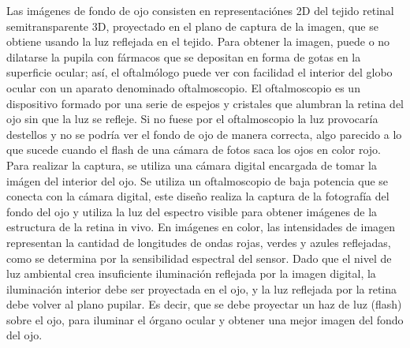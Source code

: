 Las im\'agenes de fondo de ojo consisten en representaci\'ones 2D del tejido retinal semitransparente 3D, proyectado en el plano de captura de la imagen, que se obtiene usando la luz reflejada en el tejido.
Para obtener la imagen, puede o no dilatarse la pupila con f\'armacos que se depositan en forma de gotas en la superficie ocular; as\'i, el oftalm\'ologo puede ver con facilidad el interior del globo ocular con un aparato denominado oftalmoscopio. El oftalmoscopio es un dispositivo formado por una serie de espejos y cristales que alumbran la retina del ojo sin que la luz se refleje. Si no fuese por el oftalmoscopio la luz provocar\'ia destellos y no se podría ver el fondo de ojo de manera correcta, algo parecido a lo que sucede cuando el flash de una cámara de fotos saca los ojos en color rojo. 
Para realizar la captura, se utiliza una c\'amara digital encargada de tomar la im\'agen del interior del ojo. Se utiliza un oftalmoscopio de baja potencia que se conecta con la c\'amara digital, este diseño realiza la captura de la fotograf\'ia del fondo del ojo y utiliza la luz del espectro visible para obtener im\'agenes de la estructura de la retina in vivo. En im\'agenes en color, las intensidades de imagen representan la cantidad de longitudes de ondas rojas, verdes y azules reflejadas, como se determina por la sensibilidad espectral del sensor. Dado que el nivel de luz ambiental crea insuficiente iluminaci\'on reflejada por la imagen digital, la iluminaci\'on interior debe ser proyectada en el ojo, y la luz reflejada por la retina debe volver al plano pupilar. Es decir, que se debe proyectar un haz de luz (flash) sobre el ojo, para iluminar el \'organo ocular y obtener una mejor imagen del fondo del ojo. \cite{kanagasingam2014progress}
